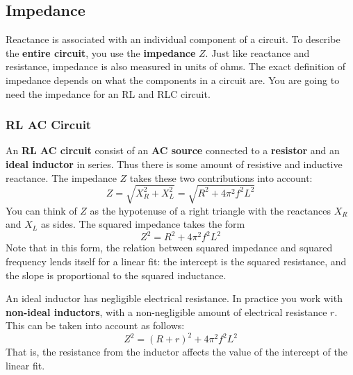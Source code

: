 \subsection{Impedance}
%
Reactance is associated with an individual component of a circuit. To describe the \textbf{entire circuit}, you use the \textbf{impedance} $Z$. Just like reactance and resistance, impedance is also measured in units of ohms. The exact definition of impedance depends on what the components in a circuit are. You are going to need the impedance for an RL and RLC circuit.
%
\subsubsection{RL AC Circuit}
%
An \textbf{RL AC circuit} consist of an \textbf{AC source} connected to a \textbf{resistor} and an \textbf{ideal inductor} in series. Thus there is some amount of resistive and inductive reactance. The impedance $Z$ takes these two contributions into account:
\begin{equation} \label{eq.06.impedance.RL}
	Z = \sqrt{X_{R}^{2} + X_{L}^{2}} = \sqrt{R^{2} + 4 \pi^{2} f^{2} L^{2}}
\end{equation}
You can think of $Z$ as the hypotenuse of a right triangle with the reactances $X_{R}$ and $X_{L}$ as sides. The squared impedance takes the form
\begin{equation} \label{eq.06.impedance.squared}
	Z^{2} = R^{2} + 4\pi^{2} f^{2} L^{2}
\end{equation}
Note that in this form, the relation between squared impedance and squared frequency lends itself for a linear fit: the intercept is the squared resistance, and the slope is proportional to the squared inductance.

An ideal inductor has negligible electrical resistance. In practice you work with \textbf{non-ideal inductors}, with a non-negligible amount of electrical resistance $r$. This can be taken into account as follows:
\begin{equation}
	Z^{2} = (R + r)^{2} + 4 \pi^{2} f^{2} L^{2}
\end{equation}
That is, the resistance from the inductor affects the value of the intercept of the linear fit.
%
